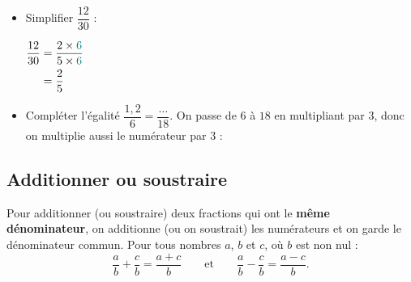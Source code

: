 \documentclass[10pt,a4paper]{article}
\begin{document}
\begin{bloc}
\begin{exples}
\begin{itemize}
    \item Simplifier \(\dfrac{12}{30}\) :

    \(\begin{aligned}[t] \dfrac{12}{30}&=\dfrac{2\times\textcolor{teal}{6}}{5\times\textcolor{teal}{6}}\\ &=\dfrac{2}{5}\end{aligned}\)
    \item Compléter l'égalité \(\dfrac{1{,}2}{6}=\dfrac{\dots}{18}\). On passe de \(6\) à \(18\) en multipliant par \(3\), donc on multiplie aussi le numérateur par \(3\) :
    \begin{center}
    \end{center}
\end{itemize}
\end{exples}
\end{bloc}

\subsection{Additionner ou soustraire}

\begin{bloc}
\begin{prop}
Pour additionner (ou soustraire) deux fractions qui ont le \textbf{même dénominateur}, on additionne (ou on soustrait) les numérateurs et on garde le dénominateur commun. Pour tous nombres \(a\), \(b\) et \(c\), où \(b\) est non nul :
\[
\dfrac{a}{b}+\dfrac{c}{b}=\dfrac{a+c}{b}
\qquad\text{et}\qquad
\dfrac{a}{b}-\dfrac{c}{b}=\dfrac{a-c}{b}.
\]
\end{prop}
\end{bloc}
\end{document}
